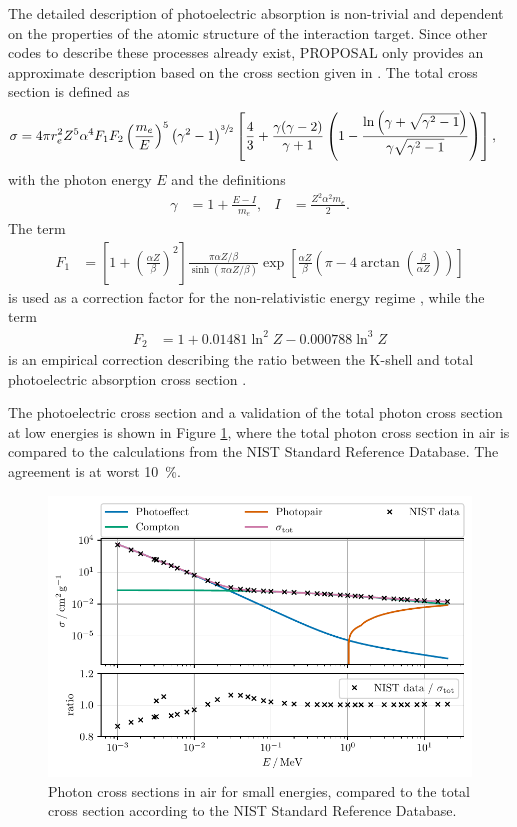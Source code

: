 The detailed description of photoelectric absorption is non-trivial and dependent on the properties of the atomic structure of the interaction target.
Since other codes to describe these processes already exist, PROPOSAL only provides an approximate description based on the cross section given in \cite{heitler, sauter}.
The total cross section is defined as
%
\begin{align}
	\label{eqn:sauter}
	\sigma &= 4 \pi r_e^2 Z^5 \alpha^4 F_1 F_2 \left( \frac{m_e}{E} \right)^5 \left( \gamma^2 -1 \right)^{\sfrac{3}{2}} \left[ \frac{4}{3} + \frac{\gamma (\gamma - 2)}{\gamma + 1} \left( 1 - \frac{\ln{\left( \gamma + \sqrt{\gamma^2 - 1} \right)}}{\gamma \sqrt{\gamma^2 - 1}}  \right) \right],
\end{align}
%
with the photon energy $E$ and the definitions
\begin{align}
	\gamma &= 1 + \frac{E - I}{m_e}, & I &= \frac{Z^2 \alpha^2 m_e}{2}.
\end{align}
%
The term
\begin{align}
	F_1 &= \left[ 1 + \left( \frac{\alpha Z}{\beta} \right)^2 \right] \frac{\pi \alpha Z / \beta }{\sinh(\pi \alpha Z / \beta )} \exp\left[ \frac{\alpha Z}{\beta} \left( \pi - 4 \arctan\left( \frac{\beta}{\alpha Z} \right) \right) \right]
\end{align}
%
is used as a correction factor for the non-relativistic energy regime \cite{sauter}, while the term
%
\begin{align}
	F_2 &= 1 + 0.01481 \ln^2{Z} - 0.000788 \ln^3{Z}
\end{align}
%
is an empirical correction describing the ratio between the K-shell and total photoelectric absorption cross section \cite{hubbell1969}.

The photoelectric cross section and a validation of the total photon cross section at low energies is shown in Figure \ref{fig:photoeffect_nist}, where the total photon cross section in air is compared to the calculations from the NIST Standard Reference Database.
The agreement is at worst \SI{10}{\percent}.

\begin{figure}
	\centering
    \includegraphics{plots/photoeffect_nist.pdf}
    \caption{Photon cross sections in air for small energies, compared to the total cross section according to the NIST Standard Reference Database.}
    \label{fig:photoeffect_nist}
\end{figure}

